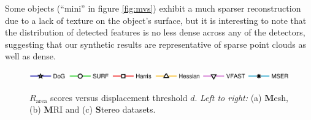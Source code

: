 Some objects (\eg ``mini'' in figure \ref{fig:mvs}) exhibit a much sparser reconstruction due to a lack of texture on the object's surface, but it is interesting to note that the distribution of detected features is no less dense across any of the detectors, suggesting that our synthetic results are representative of sparse point clouds as well as dense.

\begin{figure}[ht]
\centering
\includegraphics[width=0.80\linewidth]{./fig/eval/hlegend.jpg}\\
\vspace{-4mm}
\caption{$R_{\textrm{area}}$ scores versus displacement threshold $d$. \emph{Left to right:} (a) {\textbf Mesh}, (b) {\textbf MRI} and (c) {\textbf Stereo} datasets.}
\label{fig:graph2}
\end{figure}

